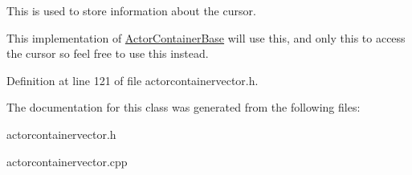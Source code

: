 This is used to store information about the cursor. 

This implementation of \hyperlink{classphys_1_1ActorContainerBase}{ActorContainerBase} will use this, and only this to access the cursor so feel free to use this instead. 

Definition at line 121 of file actorcontainervector.h.



The documentation for this class was generated from the following files:\begin{DoxyCompactItemize}
\item 
actorcontainervector.h\item 
actorcontainervector.cpp\end{DoxyCompactItemize}
